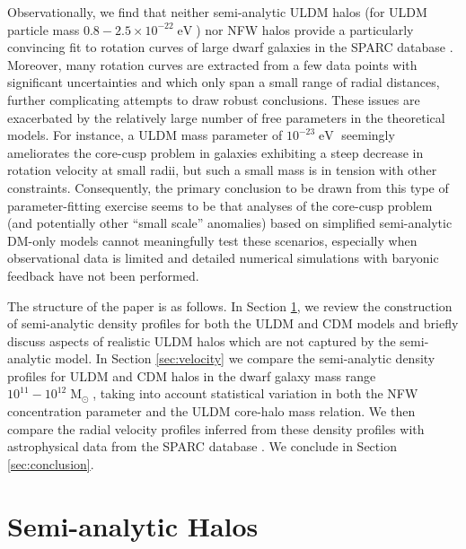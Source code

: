 \documentclass{pasa}%
\begin{document}
Observationally, we find that neither semi-analytic ULDM halos (for ULDM particle mass $0.8-2.5\times 10^{-22} \operatorname{eV}$) nor NFW halos provide a particularly convincing fit to rotation curves of large dwarf galaxies in the SPARC database \cite{Lelli:2016zqa}. Moreover, many rotation curves are extracted from a few data points with significant uncertainties and which only span a small range of radial distances, further complicating attempts to draw robust conclusions. These issues are exacerbated by the relatively large number of free parameters in the theoretical models. For instance, a ULDM mass parameter of $10^{-23}\operatorname{eV}$ seemingly ameliorates the core-cusp problem in galaxies exhibiting a steep decrease in rotation velocity at small radii, but such a small mass is in tension with other constraints. Consequently, the primary conclusion to be drawn from this type of parameter-fitting exercise seems to be that  analyses of the core-cusp problem (and potentially other ``small scale'' anomalies) based on simplified semi-analytic  DM-only models cannot meaningfully test these scenarios, especially when observational data is limited and detailed numerical simulations with baryonic feedback have not been performed. 

The structure of the paper is as follows. In Section \ref{sec:models}, we review the construction of semi-analytic density profiles for both the ULDM and CDM models and briefly discuss aspects of realistic ULDM halos which are not captured by the semi-analytic model. In Section \ref{sec:velocity} we compare the semi-analytic density profiles for ULDM and CDM halos in the dwarf galaxy mass range $10^{11} - 10^{12}\operatorname{M}_{\odot}$, taking into account statistical variation in both the NFW concentration parameter and the ULDM core-halo mass relation. We then compare the radial velocity profiles inferred from these density profiles with astrophysical data from the SPARC database \cite{Lelli:2016zqa}. We conclude in Section \ref{sec:conclusion}.


 
\section{Semi-analytic Halos}\label{sec:models}



\end{document}
